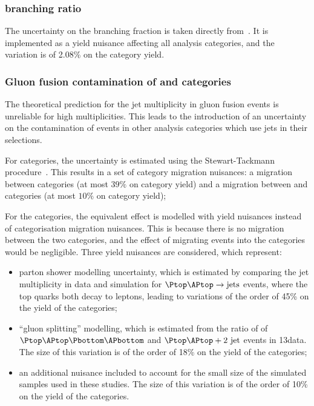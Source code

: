 \subsubsection{\Hgg branching ratio}
The uncertainty on the \SM \Hgg branching fraction is taken directly from~\cite{LHCHXSWGYR4}. It is implemented as a yield nuisance affecting all analysis categories, and the variation is of 2.08\% on the category yield.

\subsubsection{Gluon fusion contamination of \VBFTag and \TTHTag categories}
The theoretical prediction for the jet multiplicity in gluon fusion events is unreliable for high multiplicities. This leads to the introduction of an uncertainty on the contamination of \ggH events in other analysis categories which use jets in their selections. 

For \VBFTag categories, the uncertainty is estimated using the Stewart-Tackmann procedure~\cite{StewartTackmann}. This results in a set of category migration nuisances: a migration between \VBFTag categories (at most $39\%$ on category yield) and a migration between \Untagged and \VBFTag categories (at most $10\%$ on category yield); %

For the \TTHTag categories, the equivalent effect is modelled with yield nuisances instead of categorisation migration nuisances. This is because there is no migration between the two \TTHTag categories, and the effect of migrating events into the \Untagged categories would be negligible. Three yield nuisances are considered, which represent:
\begin{itemize}
\item parton shower modelling uncertainty, which is estimated by comparing the jet multiplicity in data and simulation for $\Ptop \APtop \rightarrow \text{jets}$ events, where the top quarks both decay to leptons, leading to variations of the order of 45\% on the yield of the \TTHTag categories; 
\item ``gluon splitting'' modelling, which is estimated from the ratio of \crosssection\s of $\Ptop \APtop \Pbottom \APbottom$ and $\Ptop \APtop +2\text{ jet}$ events in 13\TeV data. The size of this variation is of the order of 18\% on the yield of the \TTHTag categories;
\item an additional nuisance included to account for the small size of the simulated samples used in these studies. The size of this variation is of the order of 10\% on the yield of the \TTHTag categories.
\end{itemize}

